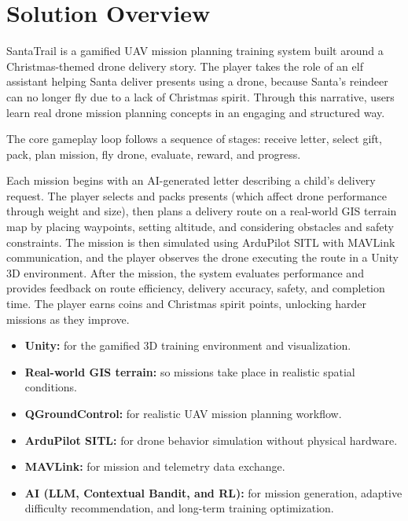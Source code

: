\section{Solution Overview}
\label{section:solution-overview}

SantaTrail is a gamified UAV mission planning training system built around a Christmas-themed drone delivery story. The player takes the role of an elf assistant helping Santa deliver presents using a drone, because Santa's reindeer can no longer fly due to a lack of Christmas spirit. Through this narrative, users learn real drone mission planning concepts in an engaging and structured way.

The core gameplay loop follows a sequence of stages: receive letter, select gift, pack, plan mission, fly drone, evaluate, reward, and progress.

Each mission begins with an AI-generated letter describing a child's delivery request. The player selects and packs presents (which affect drone performance through weight and size), then plans a delivery route on a real-world GIS terrain map by placing waypoints, setting altitude, and considering obstacles and safety constraints. The mission is then simulated using ArduPilot SITL with MAVLink communication, and the player observes the drone executing the route in a Unity 3D environment. After the mission, the system evaluates performance and provides feedback on route efficiency, delivery accuracy, safety, and completion time. The player earns coins and Christmas spirit points, unlocking harder missions as they improve.

\begin{itemize}
    \item \textbf{Unity:} for the gamified 3D training environment and visualization.
    \item \textbf{Real-world GIS terrain:} so missions take place in realistic spatial conditions.
    \item \textbf{QGroundControl:} for realistic UAV mission planning workflow.
    \item \textbf{ArduPilot SITL:} for drone behavior simulation without physical hardware.
    \item \textbf{MAVLink:} for mission and telemetry data exchange.
    \item \textbf{AI (LLM, Contextual Bandit, and RL):} for mission generation, adaptive difficulty recommendation, and long-term training optimization.
\end{itemize}


